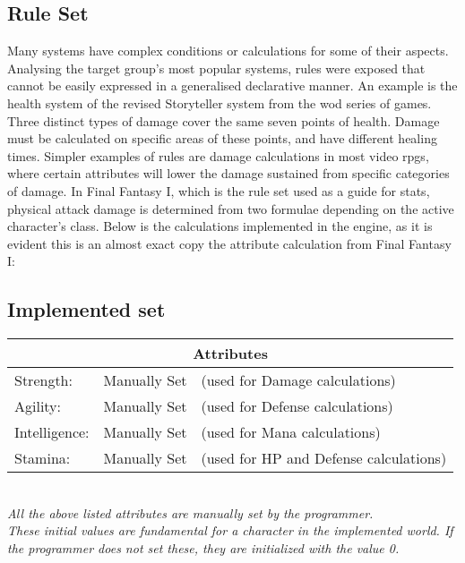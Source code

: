 \subsection{\langname{} Rule Set}
\label{language:ruleset}
Many systems have complex conditions or calculations for some of their aspects.
Analysing the target group's most popular systems, rules were exposed that cannot be easily expressed in a generalised declarative manner.
An example is the health system of the revised Storyteller system from the \ac{wod} series of games. Three distinct types of damage cover the same seven points of health. Damage must be calculated on specific areas of these points, and have different healing times.
Simpler examples of rules are damage calculations in most video \ac{rpgs},
where certain attributes will lower the damage sustained from specific categories of damage. In Final Fantasy I, which is the rule set used as a guide for stats, physical attack damage is determined from two formulae depending on the active character's class. Below is the calculations implemented in the engine, as it is evident this is an almost exact copy the attribute calculation from Final Fantasy I:

\subsection{Implemented set}
\label{language:implset}
\begin{center}
\begin{tabular}{|l l l|}
\hline
\multicolumn{3}{|c|}{\textbf{Attributes}}\\
\hline
Strength: & Manually Set & (used for Damage calculations)\\
\hline
Agility: & Manually Set	 & (used for Defense calculations)\\
\hline
Intelligence: & Manually Set & (used for Mana calculations)\\
\hline
Stamina: & Manually Set & (used for HP and Defense calculations)\\
\hline
\end{tabular}\\
\emph{All the above listed attributes are manually set by the programmer.\\ These initial values are fundamental for a character in the implemented world. If the programmer does not set these, they are initialized with the value 0.}
\end{center}

